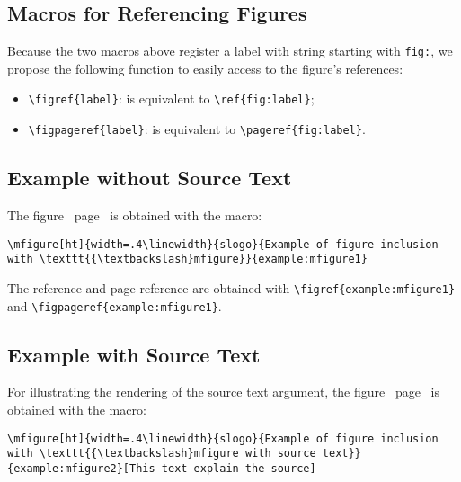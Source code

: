 \documentclass[book,taskpackage,specpackage,codepackage]{upmethodology-document}
\begin{document}
\subsection{Macros for Referencing Figures}

Because the two macros above register a label with string starting with \texttt{fig:}, we propose the following function to easily access to the figure's references:
\begin{itemize}
\item \texttt{{\textbackslash}figref\{label\}}: is equivalent to \texttt{{\textbackslash}ref\{fig:label\}};
\item \texttt{{\textbackslash}figpageref\{label\}}: is equivalent to \texttt{{\textbackslash}pageref\{fig:label\}}.
\end{itemize}

\subsection{Example without Source Text}

The figure~ page~ is obtained with the macro:

\texttt{{\textbackslash}mfigure[ht]\{width=.4{\textbackslash}linewidth\}\{slogo\}\{Example of figure inclusion with {\textbackslash}texttt\{\{{\textbackslash}textbackslash\}mfigure\}\}\{example:mfigure1\}}

The reference and page reference are obtained with \texttt{{\textbackslash}figref\{example:mfigure1\}} and \texttt{{\textbackslash}figpageref\{example:mfigure1\}}.


\subsection{Example with Source Text}

For illustrating the rendering of the source text argument, the figure~ page~ is obtained with the macro:

\texttt{{\textbackslash}mfigure[ht]\{width=.4{\textbackslash}linewidth\}\{slogo\}\{Example of figure inclusion with {\textbackslash}texttt\{\{{\textbackslash}textbackslash\}mfigure with source text\}\}\{example:mfigure2\}[This text explain the source]}
\end{document}
